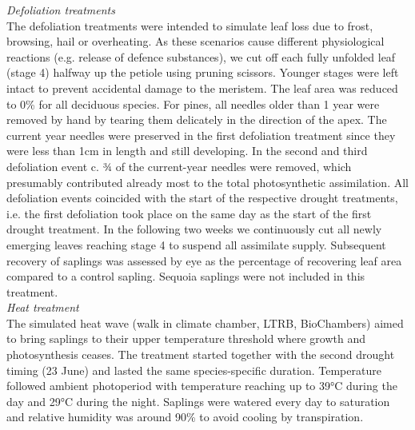\documentclass{article}
\begin{document}
	
	\textit{Defoliation treatments} \\
	The defoliation treatments were intended to simulate leaf loss due to frost, browsing, hail or overheating. As these scenarios cause different physiological reactions (e.g. release of defence substances), we cut off each fully unfolded leaf (stage 4) halfway up the petiole using pruning scissors. Younger stages were left intact to prevent accidental damage to the meristem. The leaf area was reduced to 0\% for all deciduous species. For pines, all needles older than 1 year were removed by hand by tearing them delicately in the direction of the apex. The current year needles were preserved in the first defoliation treatment since they were less than 1cm in length and still developing. In the second and third defoliation event c. ¾ of the current-year needles were removed, which presumably contributed already most to the total photosynthetic assimilation. All defoliation events coincided with the start of the respective drought treatments, i.e. the first defoliation took place on the same day as the start of the first drought treatment. In the following two weeks we continuously cut all newly emerging leaves reaching stage 4 to suspend all assimilate supply. %
	Subsequent recovery of saplings was assessed by eye as the percentage of recovering leaf area compared to a control sapling. Sequoia saplings were not included in this treatment.\\
	
	\textit{Heat treatment} \\
	The simulated heat wave (walk in climate chamber, LTRB, BioChambers) aimed to bring saplings to their upper temperature threshold where growth and photosynthesis ceases. The treatment started together with the second drought timing (23 June) and lasted the same species-specific duration. Temperature followed ambient photoperiod with temperature reaching up to 39°C during the day and 29°C during the night. Saplings were watered every day to saturation and relative humidity was around 90\% to avoid cooling by transpiration. 
	
\end{document}
